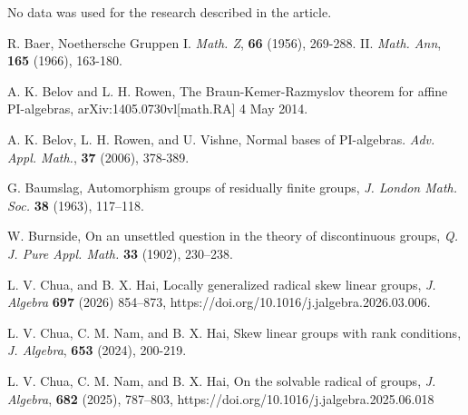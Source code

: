 \documentclass{amsart}
\theoremstyle{definition}
\begin{document}
No data was used for the research described in the article.
\begin{thebibliography}{}


 R. Baer, Noethersche Gruppen I. \textit{Math. Z}, \textbf{66} (1956), 269-288. II. \textit{Math. Ann}, \textbf{165} (1966), 163-180.


 A. K. Belov and L. H. Rowen, The Braun-Kemer-Razmyslov theorem for affine $\mathrm{PI}$-algebras, arXiv:1405.0730vl[math.RA] 4 May 2014.

 A. K. Belov, L. H. Rowen, and U. Vishne, Normal bases of $\mathrm{PI}$-algebras. \textit{Adv. Appl. Math.}, \textbf{37} (2006), 378-389.


 G. Baumslag, Automorphism groups of residually finite groups, \textit{J. London Math. Soc.} \textbf{38} (1963), 117–118.

 W. Burnside, On an unsettled question in the theory of discontinuous groups, \textit{Q. J. Pure Appl. Math.} \textbf{33} (1902), 230--238.	
	
	
 L. V. Chua, and B. X. Hai, Locally generalized radical skew linear groups, \textit{J. Algebra} \textbf{697} (2026) 854--873, https://doi.org/10.1016/j.jalgebra.2026.03.006.
	
 L. V. Chua, C. M. Nam, and B. X. Hai, Skew linear groups with rank conditions, \textit{J. Algebra}, \textbf{653} (2024), 200-219.

 L. V. Chua, C. M. Nam, and B. X. Hai, On the solvable radical of groups, \textit{J. Algebra}, \textbf{682} (2025), 787--803, https://doi.org/10.1016/j.jalgebra.2025.06.018


\end{thebibliography}
\end{document}
